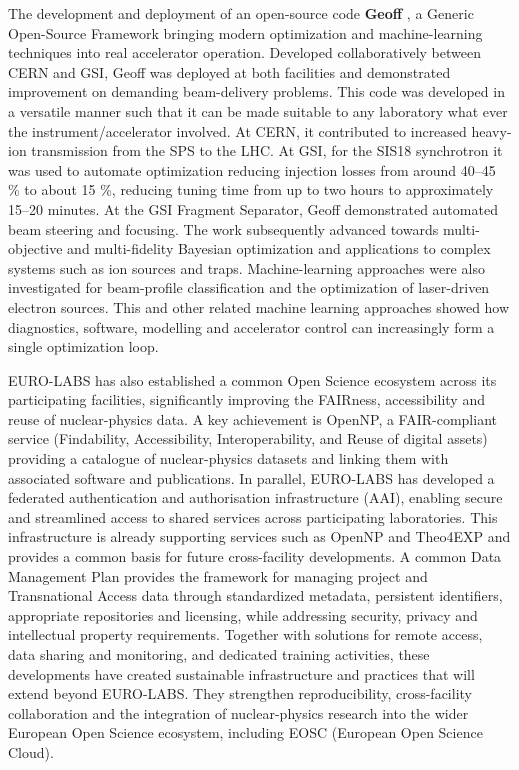 The development and deployment of an open-source code \textbf{ Geoff }, a Generic Open-Source Framework bringing modern optimization and machine-learning techniques into real accelerator operation. Developed collaboratively between CERN and GSI, Geoff was deployed at both facilities and demonstrated improvement on demanding beam-delivery problems. This code was developed in a versatile manner such that it can be made suitable to any laboratory what ever the instrument/accelerator involved. At CERN, it contributed to increased heavy-ion transmission from the SPS to the LHC. At GSI, for the SIS18 synchrotron it was used to automate optimization reducing injection losses from around 40–45 \% to about 15 \%, reducing tuning time from up to two hours to approximately 15–20 minutes. At the GSI Fragment Separator, Geoff demonstrated automated beam steering and focusing. The work subsequently advanced towards multi-objective and multi-fidelity Bayesian optimization and applications to complex systems such as ion sources and traps. Machine-learning approaches were also investigated for beam-profile classification and the optimization of laser-driven electron sources. This and other related machine learning approaches showed how diagnostics, software, modelling and accelerator control can increasingly form a single optimization loop. 

  EURO-LABS has also established a common Open Science ecosystem across its participating facilities, significantly improving the FAIRness, accessibility and reuse of nuclear-physics data. A key achievement is OpenNP, a FAIR-compliant service (Findability, Accessibility, Interoperability, and Reuse of digital assets) providing a catalogue of nuclear-physics datasets and linking them with associated software and publications. In parallel, EURO-LABS has developed a federated authentication and authorisation infrastructure (AAI), enabling secure and streamlined access to shared services across participating laboratories. This infrastructure is already supporting services such as OpenNP and Theo4EXP and provides a common basis for future cross-facility developments. A common Data Management Plan provides the framework for managing project and Transnational Access data through standardized metadata, persistent identifiers, appropriate repositories and licensing, while addressing security, privacy and intellectual property requirements. Together with solutions for remote access, data sharing and monitoring, and dedicated training activities, these developments have created sustainable infrastructure and practices that will extend beyond EURO-LABS. They strengthen reproducibility, cross-facility collaboration and the integration of nuclear-physics research into the wider European Open Science ecosystem, including EOSC (European Open Science Cloud).

